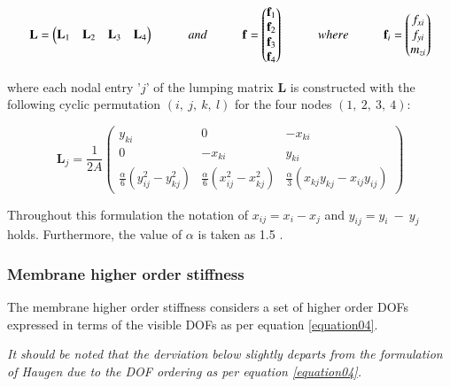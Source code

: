 \begin{equation} 
\mathbf{L} =
\begin{pmatrix}
\mathbf{L}_1 & \mathbf{L}_2 & \mathbf{L}_3 & \mathbf{L}_4
\end{pmatrix}
\hspace{10mm}
and
\hspace{10mm}
\mathbf{f} =
\begin{pmatrix}
\mathbf{f}_1 \\
\mathbf{f}_2 \\
\mathbf{f}_3 \\
\mathbf{f}_4
\end{pmatrix}
\hspace{10mm}
where
\hspace{10mm}
\mathbf{f}_i =
\begin{pmatrix}
{f_{xi}} \\
{f_{yi}} \\
{m_{zi}}
\end{pmatrix}
\label{equation06}
\end{equation}

where each nodal entry '$j$' of the lumping matrix $\textbf{L}$ is constructed with the following cyclic permutation $(i,\ j,\ k,\ l)$ for the four nodes $(1,\ 2,\ 3,\ 4)$:

\begin{equation} 
\mathbf{L}_j = \frac{1}{2 A}
\begin{pmatrix}
y_{ki} & 0 & -x_{ki} \\
0 & -x_{ki} & y_{ki} \\
\frac{\alpha}{6}(y_{ij}^2 - y_{kj}^2 ) & \frac{\alpha}{6}(x_{ij}^2 - x_{kj}^2 ) & \frac{\alpha}{3}(x_{kj}y_{kj} - x_{ij}y_{ij})
\end{pmatrix}
\label{equation07}
\end{equation}

Throughout this formulation the notation of $x_{ij} = x_i - x_j$ and $y_{ij} = y_i\ -\ y_j$ holds. Furthermore, the value of $\alpha$ is taken as 1.5 \cite{Fel91}.

\subsubsection{Membrane higher order stiffness}

The membrane higher order stiffness considers a set of higher order DOFs expressed in terms of the visible DOFs as per equation \eqref{equation04}.

\textit{It should be noted that the derviation below slightly departs from the formulation of Haugen \cite{Hau94} due to the DOF ordering as per equation \eqref{equation04}.}

